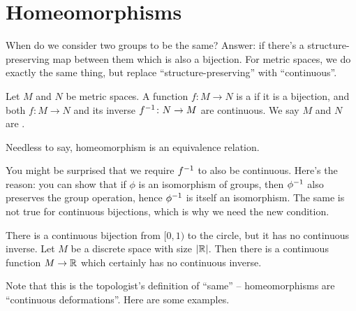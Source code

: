 \section{Homeomorphisms}

When do we consider two groups to be the same?
Answer: if there's a structure-preserving map
between them which is also a bijection.
For metric spaces, we do exactly the same thing,
but replace ``structure-preserving'' with ``continuous''.

\begin{definition}
	Let $M$ and $N$ be metric spaces.
	A function $f \colon M \to N$ is a
	 if it is a bijection,
	and both $f \colon M \to N$
	and its inverse $f^{-1} \colon N \to M$ are continuous.
	We say $M$ and $N$ are .
\end{definition}
Needless to say, homeomorphism is an equivalence relation.

You might be surprised that we require $f^{-1}$ to also be continuous.
Here's the reason: you can show that if $\phi$ is
an isomorphism of groups, then $\phi^{-1}$ also preserves the group operation,
hence $\phi^{-1}$ is itself an isomorphism.
The same is not true for continuous bijections,
which is why we need the new condition.
\begin{example}
	\listhack
	\begin{enumerate}[(a)]
		\ii There is a continuous bijection
		from $[0,1)$ to the circle, %
		but it has no continuous inverse.
		\ii Let $M$ be a discrete space with size $|\mathbb R|$.
		Then there is a continuous function $M \to \mathbb R$
		which certainly has no continuous inverse.
	\end{enumerate}
\end{example}

Note that this is the topologist's definition of ``same'' --
homeomorphisms are ``continuous deformations''.
Here are some examples.

